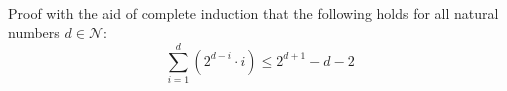  \\
Proof with the aid of complete induction that the following holds for all 
natural numbers $d \in \mathcal{N}:$
\begin{displaymath}
  \sum\limits^{d}_{i=1} (2^{d-i} \cdot i) \leq 2^{d+1} - d - 2
\end{displaymath}